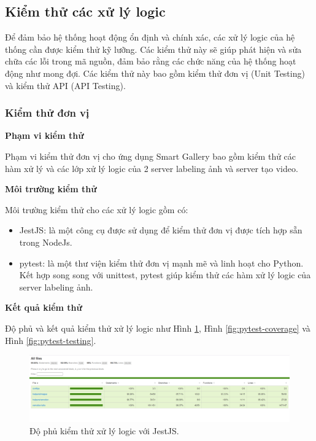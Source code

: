 \subsection{Kiểm thử các xử lý logic}

Để đảm bảo hệ thống hoạt động ổn định và chính xác, các xử lý logic của hệ thống cần được kiểm thử kỹ lưỡng. Các kiểm thử này sẽ giúp phát hiện và sửa chữa các lỗi trong mã nguồn, đảm bảo rằng các chức năng của hệ thống hoạt động như mong đợi. Các kiểm thử này bao gồm kiểm thử đơn vị (Unit Testing) và kiểm thử API (API Testing).
\subsubsection{Kiểm thử đơn vị}


\textbf{Phạm vi kiểm thử}

Phạm vi kiểm thử đơn vị cho ứng dụng Smart Gallery bao gồm kiểm thử các hàm xử lý và các lớp xử lý logic của 2 server labeling ảnh và server tạo video. 

\textbf{Môi trường kiểm thử}

Môi trường kiểm thử cho các xử lý logic gồm có: 
\begin{itemize}
    \item JestJS\cite{jestJS}: là một công cụ được sử
    dụng để kiểm thử đơn vị được tích hợp sẵn trong NodeJs.
    \item pytest\cite{pytest}: là một thư viện kiểm thử đơn vị mạnh mẽ và linh hoạt cho Python. Kết hợp song song với unittest\cite{unittest}, pytest giúp kiểm thử các hàm xử lý logic của server labeling ảnh.
\end{itemize}

\textbf{Kết quả kiểm thử}

Độ phủ và kết quả kiểm thử xử lý logic như Hình \ref{fig:jest-testing}, Hình \ref{fig:pytest-coverage} và Hình \ref{fig:pytest-testing}.

\begin{figure}[H]
    \centering  
    \includegraphics[width=1\textwidth]{figures/c4/4-3/jest.png}
    \caption{Độ phủ kiểm thử xử lý logic với JestJS.}
    \label{fig:jest-testing}
\end{figure}

